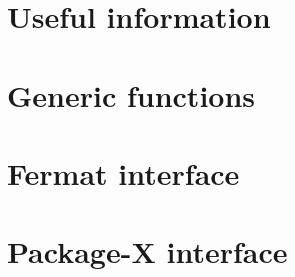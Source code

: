
\chapter{Useful information}





\chapter{Generic functions}






\chapter{Fermat interface}












\chapter{Package-X interface}





























